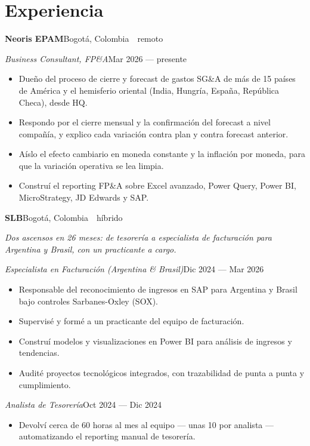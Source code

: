 \documentclass[a4paper,10pt]{article}
\newcommand{\row}[2]{\textbf{\color{ink}#1}\hfill{\small #2}\par}
\begin{document}
\section*{Experiencia}
\row{Neoris EPAM}{Bogotá, Colombia \,\textperiodcentered\, remoto}
\textit{Business Consultant, FP\&A}\hfill{\small Mar 2026 --- presente}\par
\begin{itemize}[leftmargin=1em, itemsep=0pt, topsep=1pt, parsep=0pt]
  \item Dueño del proceso de cierre y forecast de gastos SG\&A de más de 15 países de América y el hemisferio oriental (India, Hungría, España, República Checa), desde HQ.
  \item Respondo por el cierre mensual y la confirmación del forecast a nivel compañía, y explico cada variación contra plan y contra forecast anterior.
  \item Aíslo el efecto cambiario en moneda constante y la inflación por moneda, para que la variación operativa se lea limpia.
  \item Construí el reporting FP\&A sobre Excel avanzado, Power Query, Power BI, MicroStrategy, JD Edwards y SAP.
\end{itemize}
\vspace{2pt}
\row{SLB}{Bogotá, Colombia \,\textperiodcentered\, híbrido}
{\small\itshape\color{cold} Dos ascensos en 26 meses: de tesorería a especialista de facturación para Argentina y Brasil, con un practicante a cargo.}\par
\textit{Especialista en Facturación (Argentina \& Brasil)}\hfill{\small Dic 2024 --- Mar 2026}\par
\begin{itemize}[leftmargin=1em, itemsep=0pt, topsep=1pt, parsep=0pt]
  \item Responsable del reconocimiento de ingresos en SAP para Argentina y Brasil bajo controles Sarbanes-Oxley (SOX).
  \item Supervisé y formé a un practicante del equipo de facturación.
  \item Construí modelos y visualizaciones en Power BI para análisis de ingresos y tendencias.
  \item Audité proyectos tecnológicos integrados, con trazabilidad de punta a punta y cumplimiento.
\end{itemize}
\textit{Analista de Tesorería}\hfill{\small Oct 2024 --- Dic 2024}\par
\begin{itemize}[leftmargin=1em, itemsep=0pt, topsep=1pt, parsep=0pt]
  \item Devolví cerca de 60 horas al mes al equipo --- unas 10 por analista --- automatizando el reporting manual de tesorería.
\end{itemize}
\end{document}
